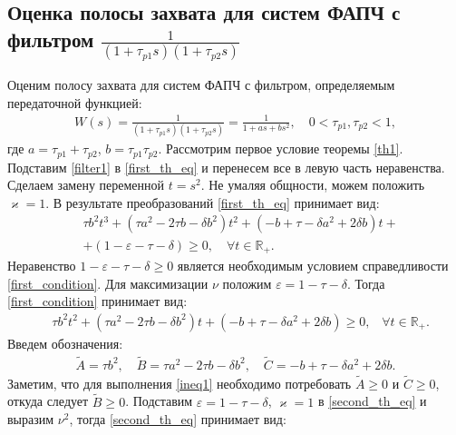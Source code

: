 \documentclass[a4paper,article,14pt]{extarticle}
\begin{document}
\subsection{Оценка полосы захвата для систем ФАПЧ с фильтром $\frac{1}{(1+\tau_{p1}s)(1+\tau_{p2}s)}$}
Оценим полосу захвата для систем ФАПЧ с фильтром, определяемым передаточной функцией:
 \begin{equation}\label{filter1}
 \begin{aligned}
W(s) = \frac{1}{(1+\tau_{p1}s)(1+\tau_{p2}s)} = \frac{1}{1+as + bs^2}, \quad 0<\tau_{p1},\tau_{p2} < 1,
 \end{aligned}
\end{equation}
где $a = \tau_{p1}+\tau_{p2}$, $b = \tau_{p1}\tau_{p2}$. Рассмотрим первое условие теоремы \ref{th1}. Подставим \eqref{filter1} в \eqref{first_th_eq} и перенесем все в левую часть неравенства. Сделаем замену переменной $t = s^2$. Не умаляя общности, можем положить $\varkappa = 1$. В результате преобразований \eqref{first_th_eq} принимает вид:
\begin{equation}\label{first_condition}
 \begin{aligned}
&\tau b^2t^3 + (\tau a^2-2 \tau b - \delta b^2)t^2 + (- b+\tau-\delta a^2 + 2\delta b)t +\\
&+ (1-\varepsilon-\tau-\delta) \geqslant 0, \quad \forall t \in \mathbb{R_+}.
 \end{aligned}
\end{equation}
Неравенство $1 - \varepsilon - \tau - \delta \geqslant 0$ является необходимым условием справедливости \eqref{first_condition}. Для максимизации $\nu$ положим $\varepsilon = 1 - \tau - \delta$. Тогда \eqref{first_condition} принимает вид:
\begin{equation}\label{ineq1} 
 \begin{aligned}
&\tau b^2t^2 + (\tau a^2-2 \tau b - \delta b^2)t + (- b+\tau-\delta a^2 + 2\delta b) \geqslant 0 \text{,}\quad \forall t \in \mathbb{R_+}.
 \end{aligned}
\end{equation}
Введем обозначения:
\begin{equation}
 \begin{aligned}
\widetilde A = \tau b^2, \quad 
\widetilde B = \tau a^2-2 \tau b - \delta b^2, \quad
\widetilde C = - b+\tau-\delta a^2 + 2\delta b.
 \end{aligned}
\end{equation}
Заметим, что для выполнения \eqref{ineq1} необходимо потребовать $\widetilde A \geqslant 0$ и $\widetilde C \geqslant 0$, откуда следует $\widetilde B \geqslant 0$. Подставим $\varepsilon = 1 - \tau - \delta$, $\varkappa = 1$ в \eqref{second_th_eq} и выразим $\nu^2$, тогда \eqref{second_th_eq} принимает вид:
\end{document}
